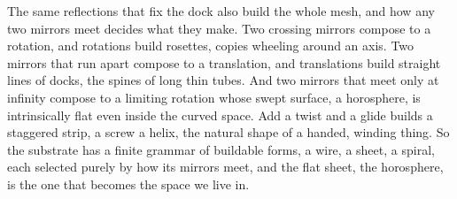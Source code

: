 The same reflections that fix the dock also build the whole mesh, and how any two mirrors meet decides what they make. Two crossing mirrors compose to a rotation, and rotations build rosettes, copies wheeling around an axis. Two mirrors that run apart compose to a translation, and translations build straight lines of docks, the spines of long thin tubes. And two mirrors that meet only at infinity compose to a limiting rotation whose swept surface, a horosphere, is intrinsically flat even inside the curved space. Add a twist and a glide builds a staggered strip, a screw a helix, the natural shape of a handed, winding thing. So the substrate has a finite grammar of buildable forms, a wire, a sheet, a spiral, each selected purely by how its mirrors meet, and the flat sheet, the horosphere, is the one that becomes the space we live in.
